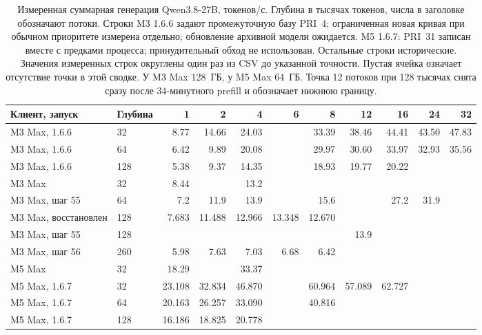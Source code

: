\begin{table}[t]
\centering
\caption{Измеренная суммарная генерация Qwen3.8-27B, токенов/с. Глубина в тысячах токенов,
числа в заголовке обозначают потоки. Строки M3 1.6.6 задают промежуточную базу PRI~4; ограниченная новая кривая при обычном приоритете измерена отдельно; обновление архивной модели ожидается. M5 1.6.7: PRI~31 записан вместе с предками процесса; принудительный обход не использован. Остальные строки исторические. Значения измеренных строк округлены один раз из CSV до указанной точности. Пустая ячейка означает отсутствие точки в этой сводке.
У M3 Max 128~ГБ, у M5 Max 64~ГБ. Точка 12 потоков при 128 тысячах снята сразу после
34-минутного prefill и обозначает нижнюю границу.}
\label{tab:parallel-decode}
\scriptsize
\begin{tabular}{llrrrrrrrrr}
\toprule
Клиент, запуск & Глубина & 1 & 2 & 4 & 6 & 8 & 12 & 16 & 24 & 32 \\
\midrule
M3 Max, 1.6.6 & 32 & 8.77 & 14.66 & 24.03 &  & 33.39 & 38.46 & 44.41 & 43.50 & 47.83 \\
M3 Max, 1.6.6 & 64 & 6.42 & 9.89 & 20.08 &  & 29.97 & 30.60 & 33.97 & 32.93 & 35.56 \\
M3 Max, 1.6.6 & 128 & 5.38 & 9.37 & 14.35 &  & 18.93 & 19.77 & 20.22 &  &  \\
M3 Max & 32 & 8.44 & & 13.2 & & & & & & \\
M3 Max, шаг 55 & 64 & 7.2 & 11.9 & 13.9 & & 15.6 & & 27.2 & 31.9 & \\
M3 Max, восстановлен & 128 & 7.683 & 11.488 & 12.966 & 13.348 & 12.670 & & & & \\
M3 Max, шаг 55 & 128 & & & & & & 13.9 & & & \\
M3 Max, шаг 56 & 260 & 5.98 & 7.63 & 7.03 & 6.68 & 6.42 & & & & \\
M5 Max & 32 & 18.29 & & 33.37 & & & & & & \\
M5 Max, 1.6.7 & 32 & 23.108 & 32.834 & 46.870 &  & 60.964 & 57.089 & 62.727 &  &  \\
M5 Max, 1.6.7 & 64 & 20.163 & 26.257 & 33.090 &  & 40.816 &  &  &  &  \\
M5 Max, 1.6.7 & 128 & 16.186 & 18.825 & 20.778 &  &  &  &  &  &  \\
\bottomrule
\end{tabular}
\end{table}


